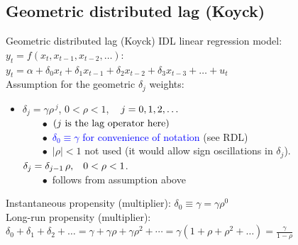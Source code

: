 \documentclass{beamer}
\begin{document}
\subsection{Geometric distributed lag (Koyck) }
\begin{frame}{Geometric distributed lag (Koyck) }
IDL linear regression model: $y_t = f(x_t, x_{t-1}, x_{t-2}, \dots)$: 
\\ \vspace{0.3cm}
$ y_t = \alpha + \delta_0 x_t + \delta_1 x_{t-1} + \delta_2 x_{t-2} + \delta_3 x_{t-3} 
+ \dots + u_t$ \\ \vspace{0.3cm}
Assumption for the geometric $\delta_j$ weights:
\begin{itemize}
\item $ \delta_{j} = \gamma \rho^{\,j}$, \hspace{0.3cm} $0 < \rho < 1 $, $\hspace{0.3cm} j=0,1,2,\dots $\\
\smallskip
~~~~$\bullet$~$\left( j \textnormal{~is the lag operator here} \right)$\\
~~~~$\bullet$~\textcolor{blue}{$\delta_0 \equiv \gamma$ for convenience of notation} (see RDL)\\
~~~~$\bullet$~$|\rho|<1$ not used (it would allow sign oscillations in $ \delta_{j}$).\\
\smallskip
$\delta_j = \delta_{j-1}\, \rho, \hspace{0.3cm} 0 < \rho < 1 $.\\
~~~~$\bullet$~follows from assumption above 
\end{itemize}
\vspace{0.3cm}
Instantaneous propensity (multiplier): $ \delta_0 \equiv \gamma = \gamma \rho^0 $ 
\\ \vspace{0.3cm}
Long-run propensity (multiplier):
\\ \vspace{0.3cm}
\footnotesize
$\delta_0+\delta_1+\delta_2 + \dots=\gamma + \gamma \rho + \gamma \rho^2 + \cdots = \gamma(1+\rho+\rho^2+\dots)=\frac{\gamma}{1-\rho}$
\end{frame}
\end{document}
